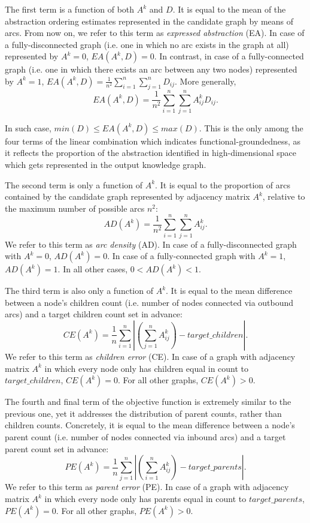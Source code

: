 The first term is a function of both $A^k$ and $D$. It is equal to the mean of the abstraction ordering estimates represented in the candidate graph by means of arcs. From now on, we refer to this term as \textit{expressed abstraction} (EA). In case of a fully-disconnected graph (i.e. one in which no arc exists in the graph at all) represented by $A^k = 0$, $EA(A^k, D) = 0$. In contrast, in case of a fully-connected graph (i.e. one in which there exists an arc between any two nodes) represented by $A^k = 1$, $EA(A^k, D) = \frac{1}{n^2} \sum_{i=1}^{n} \sum_{j=1}^{n} D_{ij}.$ More generally, $$EA(A^k, D) = \frac{1}{n^2} \sum_{i=1}^{n} \sum_{j=1}^{n} A^k_{ij}D_{ij}.$$

In such case, $min(D) \leq EA(A^k, D) \leq max(D)$. This is the only among the four terms of the linear combination which indicates functional-groundedness, as it reflects the proportion of the abstraction identified in high-dimensional space which gets represented in the output knowledge graph.

The second term is only a function of $A^k$. It is equal to the proportion of arcs contained by the candidate graph represented by adjacency matrix $A^k$, relative to the maximum number of possible arcs $n^2$: $$AD(A^k) = \frac{1}{n^2} \sum_{i=1}^{n} \sum_{j=1}^{n} A^k_{ij}.$$ We refer to this term as \textit{arc density} (AD). In case of a fully-disconnected graph with $A^k = 0$, $AD(A^k) = 0$. In case of a fully-connected graph with $A^k = 1$, $AD(A^k) = 1$. In all other cases, $0 < AD(A^k) < 1$.

The third term is also only a function of $A^k$. It is equal to the mean difference between a node's children count (i.e. number of nodes connected via outbound arcs) and a target children count set in advance: $$CE(A^k) = \frac{1}{n} \sum_{i=1}^{n} \left|(\sum_{j=1}^{n}A^k_{ij}) - target\_children\right|.$$ We refer to this term as \textit{children error} (CE). In case of a graph with adjacency matrix $A^k$ in which every node only has children equal in count to $target\_children$, $CE(A^k)=0$. For all other graphs, $CE(A^k) > 0$.

The fourth and final term of the objective function is extremely similar to the previous one, yet it addresses the distribution of parent counts, rather than children counts. Concretely, it is equal to the mean difference between a node's parent count (i.e. number of nodes connected via inbound arcs) and a target parent count set in advance: $$PE(A^k) = \frac{1}{n} \sum_{j=1}^{n} \left|(\sum_{i=1}^{n}A^k_{ij}) - target\_parents\right|.$$ We refer to this term as \textit{parent error} (PE). In case of a graph with adjacency matrix $A^k$ in which every node only has parents equal in count to $target\_parents$, $PE(A^k)=0$. For all other graphs, $PE(A^k) > 0$.

